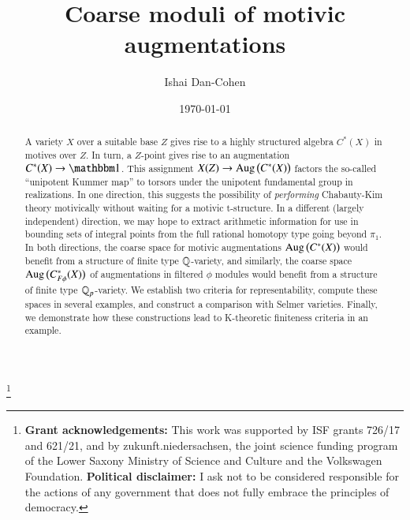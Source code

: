 






\title{Coarse moduli of motivic augmentations}

\author{Ishai Dan-Cohen}
\address{Ben Gurion University of the Negev}

\thanks{\textbf{Grant acknowledgements:} This work was supported by ISF grants 726/17 and 621/21, and by zukunft.niedersachsen, the joint science funding program of the
Lower Saxony Ministry of Science and Culture and the Volkswagen
Foundation. \textbf{Political disclaimer:} I ask not to be considered responsible for the actions of any government that does not fully embrace the principles of democracy. }


\date{\today}



\begin{abstract}
A variety $X$ over a suitable base $Z$ gives rise to a highly structured algebra $C^*(X)$ in motives over $Z$. In turn, a $Z$-point gives rise to an augmentation $C^*(X) \to \one$. This assignment $X(Z) \to \operatorname{Aug} \big( C^*(X) \big)$ factors the so-called ``unipotent Kummer map'' to torsors under the unipotent fundamental group in realizations. In one direction, this suggests the possibility of \textit{performing} Chabauty-Kim theory motivically without waiting for a motivic t-structure. In a different (largely independent) direction, we may hope to extract arithmetic information for use in bounding sets of integral points from the full rational homotopy type going beyond $\pi_1$. In both directions, the coarse space for motivic augmentations $\operatorname{Aug} \big( C^*(X) \big)$ would benefit from a structure of finite type $\mathbb{Q}$-variety, and similarly, the coarse space $\operatorname{Aug} \big( C^*_{F\phi}(X) \big)$ of augmentations in filtered $\phi$ modules would benefit from a structure of finite type ${\mathbb{Q}_p}$-variety. We establish two criteria for representability, compute these spaces in several examples, and construct a comparison with Selmer varieties. Finally, we demonstrate how these constructions lead to K-theoretic finiteness criteria in an example. 
\end{abstract}

